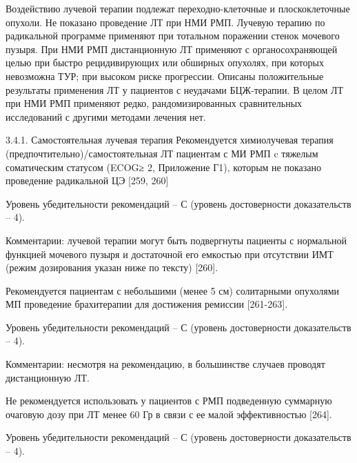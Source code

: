 Воздействию лучевой терапии подлежат переходно-клеточные и плоскоклеточные опухоли.  Не показано проведение ЛТ при НМИ РМП. Лучевую терапию по радикальной программе применяют при тотальном поражении стенок мочевого пузыря. При НМИ РМП дистанционную ЛТ применяют с органосохраняющей целью при быстро рецидивирующих или обширных опухолях, при которых невозможна ТУР; при высоком риске прогрессии. Описаны положительные результаты применения ЛТ у пациентов с неудачами БЦЖ-терапии. В целом ЛТ при НМИ РМП применяют редко, рандомизированных сравнительных исследований с другими методами лечения нет.

3.4.1. Самостоятельная лучевая терапия
Рекомендуется химиолучевая терапия (предпочтительно)/самостоятельная ЛТ пациентам с МИ РМП c тяжелым соматическим статусом (ECOG≥ 2, Приложение Г1), которым не показано проведение радикальной ЦЭ [259, 260]

Уровень убедительности рекомендаций – С (уровень достоверности доказательств – 4).

Комментарии: лучевой терапии могут быть подвергнуты пациенты с нормальной функцией мочевого пузыря и достаточной его емкостью при отсутствии ИМТ (режим дозирования указан ниже по тексту) [260].

Рекомендуется пациентам с небольшими (менее 5 см) солитарными опухолями МП проведение брахитерапии для достижения ремиссии [261-263].

Уровень убедительности рекомендаций – С (уровень достоверности доказательств – 4).

Комментарии: несмотря на рекомендацию, в большинстве случаев проводят дистанционную ЛТ. 

Не рекомендуется использовать у пациентов с РМП подведенную суммарную очаговую дозу при ЛТ менее 60 Гр в связи с ее малой эффективностью [264].

Уровень убедительности рекомендаций – С (уровень достоверности доказательств – 4).

